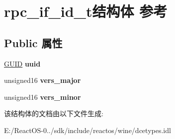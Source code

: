 \hypertarget{structrpc__if__id__t}{}\section{rpc\+\_\+if\+\_\+id\+\_\+t结构体 参考}
\label{structrpc__if__id__t}
\subsection*{Public 属性}
\begin{DoxyCompactItemize}
\item 
\mbox{\label{structrpc__if__id__t_a83847bdce6e19303d4b6f181b0427f12}} 
\hyperlink{interface_g_u_i_d}{G\+U\+ID} {\bfseries uuid}
\item 
\mbox{\label{structrpc__if__id__t_ac0fc698ed2c2f81be7732794c24eb9f9}} 
unsigned16 {\bfseries vers\+\_\+major}
\item 
\mbox{\label{structrpc__if__id__t_ae70e9e07aab575ca6e2251e459bc4b99}} 
unsigned16 {\bfseries vers\+\_\+minor}
\end{DoxyCompactItemize}


该结构体的文档由以下文件生成\+:\begin{DoxyCompactItemize}
\item 
E\+:/\+React\+O\+S-\/0../sdk/include/reactos/wine/dcetypes.\+idl\end{DoxyCompactItemize}
